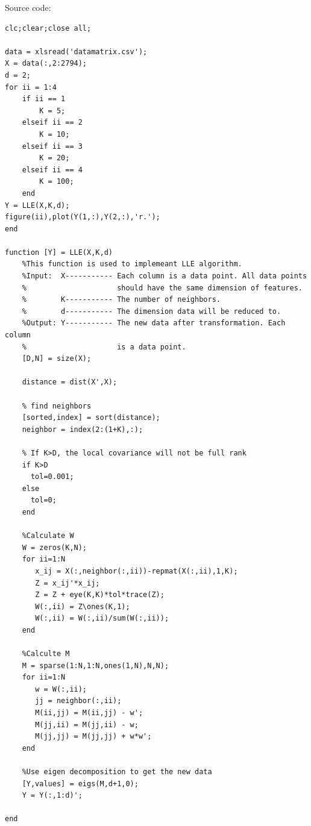 \documentclass[22pt]{article}
\begin{document}
	Source code:
	\begin{lstlisting}
clc;clear;close all;

data = xlsread('datamatrix.csv');
X = data(:,2:2794);
d = 2;
for ii = 1:4
    if ii == 1
        K = 5;
    elseif ii == 2
        K = 10;
    elseif ii == 3
        K = 20;
    elseif ii == 4
        K = 100;
    end
Y = LLE(X,K,d);
figure(ii),plot(Y(1,:),Y(2,:),'r.');
end

function [Y] = LLE(X,K,d)
    %This function is used to implemeant LLE algorithm.
    %Input:  X----------- Each column is a data point. All data points
    %                     should have the same dimension of features.
    %        K----------- The number of neighbors.
    %        d----------- The dimension data will be reduced to.
    %Output: Y----------- The new data after transformation. Each column
    %                     is a data point.
    [D,N] = size(X);

    distance = dist(X',X);
    
    % find neighbors
    [sorted,index] = sort(distance);
    neighbor = index(2:(1+K),:);
    
    % If K>D, the local covariance will not be full rank
    if K>D
      tol=0.001; 
    else
      tol=0;
    end
    
    %Calculate W
    W = zeros(K,N);
    for ii=1:N
       x_ij = X(:,neighbor(:,ii))-repmat(X(:,ii),1,K);
       Z = x_ij'*x_ij;                                     
       Z = Z + eye(K,K)*tol*trace(Z);                   
       W(:,ii) = Z\ones(K,1);                        
       W(:,ii) = W(:,ii)/sum(W(:,ii));                
    end

    %Calculte M
    M = sparse(1:N,1:N,ones(1,N),N,N); 
    for ii=1:N
       w = W(:,ii);
       jj = neighbor(:,ii);
       M(ii,jj) = M(ii,jj) - w';
       M(jj,ii) = M(jj,ii) - w;
       M(jj,jj) = M(jj,jj) + w*w';
    end
    
    %Use eigen decomposition to get the new data
    [Y,values] = eigs(M,d+1,0);
    Y = Y(:,1:d)'; 

end
	\end{lstlisting}
\end{document}
